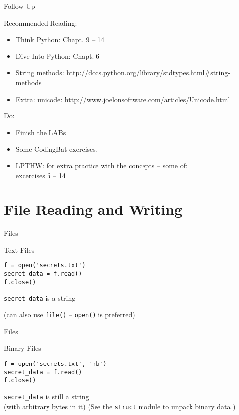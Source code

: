 \documentclass{beamer}
\begin{document}
\begin{frame}[fragile]{Follow Up}

{\Large Recommended Reading:}
\begin{itemize}
  \item Think Python: Chapt. 9 -- 14
  \item Dive Into Python: Chapt. 6
  \item String methods: \url{http://docs.python.org/library/stdtypes.html#string-methods}
  \item Extra: unicode: \url{http://www.joelonsoftware.com/articles/Unicode.html}
\end{itemize}

\vfill
{\Large Do:}
\begin{itemize}
    \item Finish the LABs
    \item Some CodingBat exercises. 
    \item LPTHW: for extra practice with the concepts -- some of:\\
          excercises 5 -- 14
\end{itemize}

\end{frame}

\section{File Reading and Writing}

\begin{frame}[fragile]{Files}

{\Large Text Files}

\begin{verbatim}
f = open('secrets.txt')
secret_data = f.read()
f.close()
\end{verbatim}

{\Large \verb|secret_data| is a string}

\vfill
(can also use \verb|file()| -- \verb|open()| is preferred)
\end{frame}

\begin{frame}[fragile]{Files}

{\Large Binary Files}

\begin{verbatim}
f = open('secrets.txt', 'rb')
secret_data = f.read()
f.close()
\end{verbatim}

{\Large \verb|secret_data| is still a string \\[.1in]
(with arbitrary bytes in it)}
\vfill
(See the \verb|struct| module to unpack binary data )
\end{frame}
\end{document}
